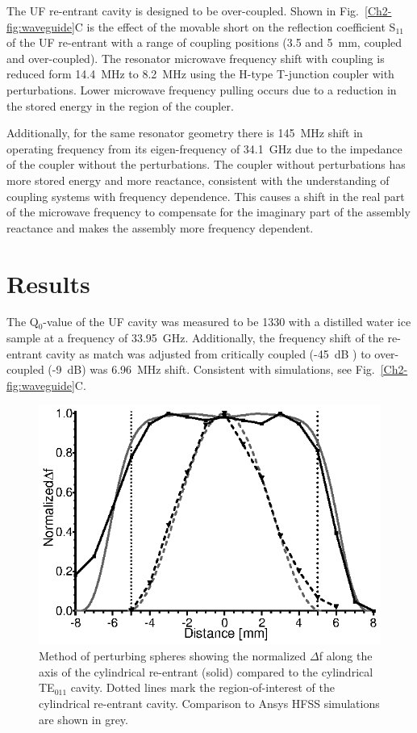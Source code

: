 The UF re-entrant \cylTE{} cavity is designed to be over-coupled. Shown in Fig.~\ref{Ch2-fig:waveguide}C is the effect of the movable short on the reflection coefficient S$_{\text{11}}$ of the UF re-entrant \cylTE{} with a range of coupling positions (3.5 and 5~mm, coupled and over-coupled). The resonator microwave frequency shift with coupling is reduced form 14.4~MHz to 8.2~MHz using the H-type T-junction coupler with perturbations. Lower microwave frequency pulling occurs due to a reduction in the stored energy in the region of the coupler. 

Additionally, for the same resonator geometry there is 145~MHz shift in operating frequency from its eigen-frequency of 34.1~GHz due to the impedance of the coupler without the perturbations. The coupler without perturbations has more stored energy and more reactance, consistent with the understanding of coupling systems with frequency dependence. \cite{Mett2009} This causes a shift in the real part of the microwave frequency to compensate for the imaginary part of the assembly reactance and makes the assembly more frequency dependent. 

\section{Results}
The Q$_0$-value of the UF cavity was measured to be 1330 with a distilled water ice sample at a frequency of 33.95~GHz. Additionally, the frequency shift of the re-entrant \cylTE{} cavity as match was adjusted from critically coupled (-45~dB ) to over-coupled (-9~dB) was 6.96~MHz shift. Consistent with simulations, see Fig.~\ref{Ch2-fig:waveguide}C. 

\begin{figure}[htp]\centering
 \includegraphics{Kapitel/Ch2-Images/05-TE01Uperturb.eps}
 \caption[Measured magnetic field using perturbing spheres.]{Method of perturbing spheres showing the normalized $\Delta$f along the axis of the cylindrical re-entrant \cylTE{} (solid) compared to the cylindrical TE$_{\text{011}}$ cavity. Dotted lines mark the region-of-interest of the cylindrical re-entrant \cylTE{} cavity.  Comparison to Ansys HFSS simulations are shown in grey.}
 \label{Ch2-fig:perturb}
\end{figure}


